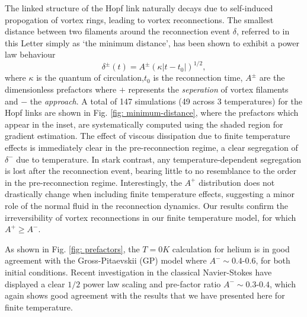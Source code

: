 \documentclass[%
 reprint,
 amsmath,amssymb,
 aps,
 prl,
]{revtex4-2}
\begin{document}
The linked structure of the Hopf link naturally decays due to self-induced propogation of vortex rings, leading to vortex reconnections. The smallest distance between two filaments around the reconnection event $\delta$, referred to in this Letter simply as `the minimum distance', has been shown to exhibit a power law behaviour
\begin{equation}
	\delta^{\pm}(t) = A^{\pm} (\kappa|t-t_0|)^{1/2},
\end{equation} 
where $\kappa$ is the quantum of circulation,$t_0$ is the reconnection time, $A^{\pm}$ are the dimensionless prefactors  where $+$ represents the \emph{seperation} of vortex filaments and $-$ the \emph{approach}. A total of 147 simulations (49 across 3 temperatures) for the Hopf links are shown in Fig. \ref{fig: minimum-distance}, where the prefactors which appear in the inset, are systematically computed using the shaded region for gradient estimation. The effect of viscous dissipation due to finite temperature effects is immediately clear in the pre-reconnection regime, a clear segregation of $\delta^-$ due to temperature. In stark contrast, any temperature-dependent segregation is lost after the reconnection event, bearing little to no resemblance to the order in the pre-reconnection regime. Interestingly, the $A^{+}$ distribution does not drastically change when including finite temperature effects, suggesting a minor role of the normal fluid in the reconnection dynamics. Our results confirm the irreversibility of vortex reconnections in our finite temperature model, for which $A^{+}\geq A^{-}$. 

As shown in Fig. \ref{fig: prefactors}, the $T=0K$ calculation for helium is in good agreement with the Gross-Pitaevskii (GP) model where $A^-\sim0.4$-$0.6$, for both initial conditions. Recent investigation in the classical Navier-Stokes \cite{yaoSeparationScalingViscous2020} have displayed a clear $1/2$ power law scaling and pre-factor ratio $A^-\sim0.3$-$0.4$, which again shows good agreement with the results that we have presented here for finite temperature. 
\end{document}
